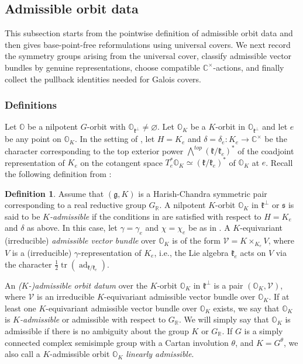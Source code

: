\documentclass[11pt, a4paper]{amsart}
\newcommand{\C}{\mathbb{C}}
\newcommand{\g}{\mathfrak{g}}
\newcommand{\orb}{\mathbb{O}}
\newcommand{\orbk}{\orb_{K}}
\newcommand{\fk}{\mathfrak{k}}
\newcommand{\fs}{\mathfrak{s}}
\newcommand{\cV}{\mathcal{V}}
\newcommand{\R}{\mathbb{R}}
\newcommand{\cm}{\C^\times}
\newcommand{\GR}{G_\R}
\theoremstyle{definition}
\newtheorem{defi}[Thm]{Definition}
\numberwithin{equation}{section}
\begin{document}
\subsection{Admissible orbit data}\label{subsec:AOD}

This subsection starts from the pointwise definition of admissible orbit data and then gives base-point-free reformulations using universal covers. We next record the symmetry groups arising from the universal cover, classify admissible vector bundles by genuine representations, choose compatible $\cm$-actions, and finally collect the pullback identities needed for Galois covers.

\subsubsection{Definitions} \label{subsubsec:AOD_defn}

Let $\orb$ be a nilpotent $G$-orbit with $\orb_{\fk^\perp}\neq \varnothing$.
Let $\orbk$ be a $K$-orbit in $\orb_{\fk^\perp}$ and let $e$ be any point on $\orbk$. In the setting of , let $H = K_e$ and $\delta = \delta_e: K_e \to \cm$ be the character corresponding to the top exterior power $\bigwedge^{top}(\fk / \fk_e)^*$ of the coadjoint representation of $K_e$ on the cotangent space $T^*_e \orbk \simeq (\fk / \fk_e)^*$ of $\orbk$ at $e$. Recall the following definition from \cite[Definition 7.13]{Vogan_AV}:

\begin{defi} \label{defn:adm_orbit_datum}
	Assume that $(\g, K)$ is a Harish-Chandra symmetric pair corresponding to a real reductive group $\GR$. A nilpotent $K$-orbit $\orbk$ in $\fk^\perp$ or $\fs$ is said to be \emph{$K$-admissible} if the conditions in  are satisfied with respect to $H = K_e$ and $\delta$ as above. In this case, let $\gamma = \gamma_e$ and $\chi = \chi_e$ be as in .
	A $K$-equivariant (irreducible) \emph{admissible vector bundle} over $\orbk$ is of the form $\cV = K \times_{K_e} V$, where $V$ is a (irreducible) $\gamma$-representation of $K_e$, i.e., the Lie algebra $\fk_e$ acts on $V$ via the character $\frac{1}{2} \operatorname{tr}(\operatorname{ad}_{\fk/\fk_e})$. 
	
	An {\it ($K$-)admissible orbit datum} over the $K$-orbit $\orbk$ in $\fk^\perp$ is a pair $(\orbk, \cV)$, where $\cV$ is an irreducible $K$-equivariant admissible vector bundle over $\orbk$. If at least one $K$-equivariant admissible vector bundle over $\orbk$ exists, we say that $\orbk$ is {\it $K$-admissible} or admissible with respect to $\GR$. We will simply say that $\orbk$ is admissible if there is no ambiguity about the group $K$ or $\GR$. If $G$ is a simply connected complex semisimple group with a Cartan involution $\theta$, and $K = G^\theta$, we also call a $K$-admissible orbit $\orbk$ {\it linearly admissible}. 
\end{defi}
\end{document}

